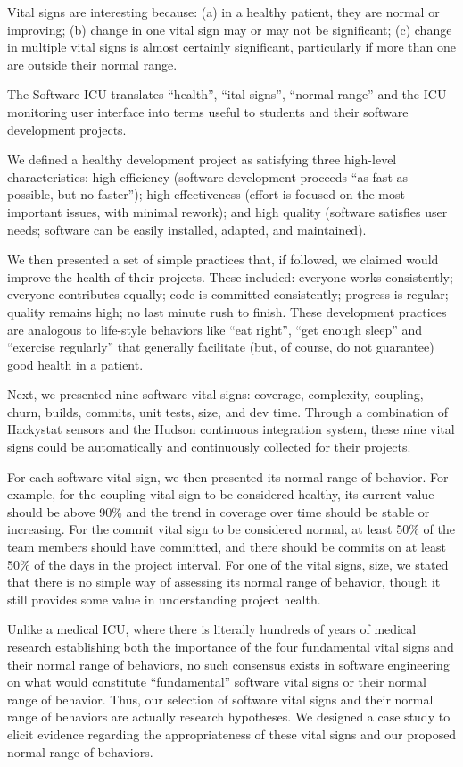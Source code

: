 Vital signs are interesting because: (a) in a healthy patient, they are
normal or improving; (b) change in one vital sign may or may not be
significant; (c) change in multiple vital signs is almost certainly
significant, particularly if more than one are outside their normal range.

The Software ICU translates ``health'', ``ital signs'', ``normal range''
and the ICU monitoring user interface into terms useful to students and their
software development projects.

We defined a healthy development project as satisfying three high-level
characteristics: high efficiency (software development proceeds ``as fast
as possible, but no faster''); high effectiveness (effort is focused on the
most important issues, with minimal rework); and high quality (software
satisfies user needs; software can be easily installed, adapted, and
maintained).

We then presented a set of simple practices that, if followed, we claimed
would improve the health of their projects.  These included: everyone works
consistently; everyone contributes equally; code is committed consistently;
progress is regular; quality remains high; no last minute rush to finish.
These development practices are analogous to life-style behaviors like
``eat right'', ``get enough sleep'' and ``exercise regularly'' that
generally facilitate (but, of course, do not guarantee) good health in a
patient.

Next, we presented nine software vital signs: coverage, complexity,
coupling, churn, builds, commits, unit tests, size, and dev time. Through a
combination of Hackystat sensors and the Hudson continuous integration
system, these nine vital signs could be automatically and continuously
collected for their projects.

For each software vital sign, we then presented its normal range of
behavior.  For example, for the coupling vital sign to be considered
healthy, its current value should be above 90\% and the trend in
coverage over time should be stable or increasing.  For the commit vital
sign to be considered normal, at least 50\% of the team members should have
committed, and there should be commits on at least 50\% of the days in the
project interval.  For one of the vital signs, size, we stated that
there is no simple way of assessing its normal range of behavior, though
it still provides some value in understanding project health.

Unlike a medical ICU, where there is literally hundreds of years of medical
research establishing both the importance of the four fundamental vital
signs and their normal range of behaviors, no such consensus exists in
software engineering on what would constitute ``fundamental'' software
vital signs or their normal range of behavior.  Thus, our selection of
software vital signs and their normal range of behaviors are actually
research hypotheses.  We designed a case study to elicit evidence
regarding the appropriateness of these vital signs and our proposed normal
range of behaviors.

